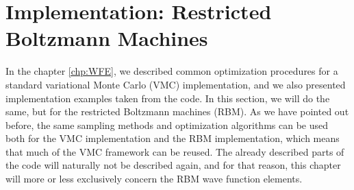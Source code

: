 \chapter{Implementation: Restricted Boltzmann Machines} \label{chp:rbmimplementation}
In the chapter \ref{chp:WFE}, we described common optimization procedures for a standard variational Monte Carlo (VMC) implementation, and we also presented implementation examples taken from the code. In this section, we will do the same, but for the restricted Boltzmann machines (RBM). As we have pointed out before, the same sampling methods and optimization algorithms can be used both for the VMC implementation and the RBM implementation, which means that much of the VMC framework can be reused. The already described parts of the code will naturally not be described again, and for that reason, this chapter will more or less exclusively concern the RBM wave function elements.

